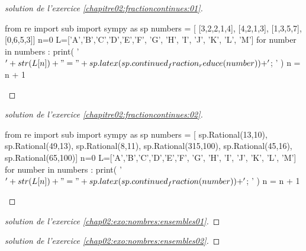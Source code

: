 \begin{proof}[solution de l'exercice \ref{chapitre02:fractioncontinues:01}]   
\begin{pycode}
from re import sub
import sympy as sp
numbers = [
[3,2,2,1,4], 
[4,2,1,3], 
[1,3,5,7], 
[0,6,5,3]]
n=0
L=['A','B','C','D','E','F', 'G', 'H', 'I', 'J', 'K', 'L', 'M']
for number in numbers :   
	print( '$'+ str(L[n])  + "=" + sp.latex(sp.continued_fraction_reduce(number)) + '$; ' ) 
	n     = n + 1	 
\end{pycode} 
\end{proof}
\begin{proof}[solution de l'exercice \ref{chapitre02:fractioncontinues:02}]   
\begin{pycode}
from re import sub
import sympy as sp
numbers = [
sp.Rational(13,10), 
sp.Rational(49,13), 
sp.Rational(8,11), 
sp.Rational(315,100), 
sp.Rational(45,16), 
sp.Rational(65,100)]
n=0
L=['A','B','C','D','E','F', 'G', 'H', 'I', 'J', 'K', 'L', 'M']
for number in numbers :   
	print( '$'+ str(L[n])  + "=" + sp.latex(sp.continued_fraction(number)) + '$; ' ) 
	n     = n + 1	 
\end{pycode}  
\end{proof}
\begin{proof}[solution de l'exercice \ref{chap02:exo:nombres:ensembles01}]\hfill 
	
		
\end{proof}
\begin{proof}[solution de l'exercice \ref{chap02:exo:nombres:ensembles02}]\hfill 
 

\end{proof}
 
%	 
